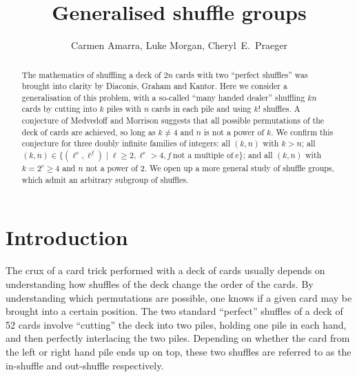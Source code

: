 \documentclass[12pt]{amsart}
\title{Generalised shuffle groups}
\author{Carmen Amarra, Luke Morgan, Cheryl~E.~Praeger}
\theoremstyle{remark}
\theoremstyle{definition}
\begin{document}
\begin{abstract}
The mathematics of shuffling a deck of $2n$ cards with two ``perfect shuffles'' was brought into clarity by Diaconis, Graham and Kantor. Here we consider a generalisation of this problem, with a so-called ``many handed dealer'' shuffling $kn$ cards by cutting into $k$ piles with $n$ cards in each pile and using $k!$ shuffles. A conjecture of Medvedoff and Morrison suggests that all possible permutations of the deck of cards are achieved, so long as $k\neq 4$ and $n$ is not a power of $k$.  We confirm this conjecture for three doubly infinite families of integers: all $(k,n)$ with $k>n$; all $(k, n)\in \{ (\ell^e, \ell^f )\mid \ell \geqslant 2, \ell^e>4, f \ \mbox{not a multiple of}\ e\}$; and all $(k,n)$ with 
$k=2^e\geqslant 4$ and $n$ not a power of $2$. We open up a more general study of shuffle groups, which admit an arbitrary subgroup of shuffles.
\end{abstract}


\maketitle






\section{Introduction}

The crux of a card trick performed with a deck of cards usually depends on understanding how shuffles of the deck  change the order of the cards. By understanding which permutations are possible, one knows if a given card may be brought into a certain position. The two standard ``perfect'' shuffles of a deck of 52 cards involve ``cutting'' the deck into two piles, holding one pile in each hand, and then perfectly interlacing the two piles. Depending on whether the card from the left or right hand pile ends up on top, these two shuffles are referred to as the in-shuffle and out-shuffle respectively. 

\end{document}
